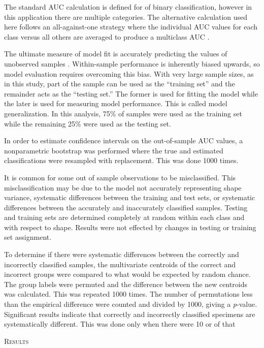 \documentclass[12pt,letterpaper]{article}
\renewcommand{\section}[1]{%
\bigskip
\begin{center}
\begin{Large}
\normalfont\scshape #1
\medskip
\end{Large}
\end{center}}
\begin{document}
The standard AUC calculation is defined for of binary classification, however in this application there are multiple categories. The alternative calculation used here follows an all-against-one strategy where the individual AUC values for each class versus all others are averaged to produce a multiclass AUC \citep{Hand2001}.

The ultimate measure of model fit is accurately predicting the values of unobserved samples \citep{Hastie2009,Kuhn2013}. Within-sample performance is inherently biased upwards, so model evaluation requires overcoming this bias. With very large sample sizes, as in this study, part of the sample can be used as the ``training set'' and the remainder acts as the ``testing set.'' The former is used for fitting the model while the later is used for measuring model performance. This is called model generalization. In this analysis, 75\% of samples were used as the training set while the remaining 25\% were used as the testing set.

In order to estimate confidence intervals on the out-of-sample AUC values, a nonparametric bootstrap was performed where the true and estimated classifications were resampled with replacement. This was done 1000 times.

It is common for some out of sample observations to be misclassified. This misclassification may be due to the model not accurately representing shape variance, systematic differences between the training and test sets, or systematic differences between the accurately and inaccurately classified samples. Testing and training sets are determined completely at random within each class and with respect to shape. Results were not effected by changes in testing or training set assignment.

To determine if there were systematic differences between the correctly and incorrectly classified samples, the multivariate centroids of the correct and incorrect groups were compared to what would be expected by random chance. The group labels were permuted and the difference between the new centroids was calculated. This was repeated 1000 times. The number of permutations less than the empirical difference were counted and divided by 1000, giving a \textit{p}-value. Significant results indicate that correctly and incorrectly classified specimens are systematically different. This was done only when there were 10 or of that 



\section{Results}
\end{document}
